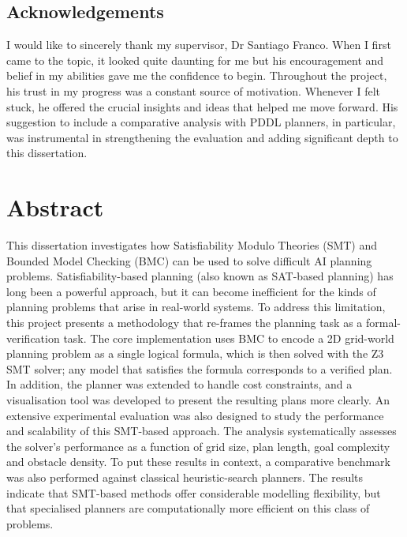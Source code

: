\documentclass[12pt, a4paper, oneside]{report} %
\begin{document}
\begin{center}
    \section*{Acknowledgements}

    I would like to sincerely thank my supervisor, Dr Santiago Franco. When I first came to the topic, it looked quite daunting for me but his encouragement and belief in my abilities gave me the confidence to begin. Throughout the project, his trust in my progress was a constant source of motivation. Whenever I felt stuck, he offered the crucial insights and ideas that helped me move forward. His suggestion to include a comparative analysis with PDDL planners, in particular, was instrumental in strengthening the evaluation and adding significant depth to this dissertation.
\end{center}

\chapter*{Abstract}
\thispagestyle{empty} 
This dissertation investigates how Satisfiability Modulo Theories (SMT) and Bounded Model Checking (BMC) can be used to solve difficult AI planning problems. Satisfiability-based planning (also known as SAT-based planning) has long been a powerful approach, but it can become inefficient for the kinds of planning problems that arise in real-world systems. To address this limitation, this project presents a methodology that re-frames the planning task as a formal-verification task. The core implementation uses BMC to encode a 2D grid-world planning problem as a single logical formula, which is then solved with the Z3 SMT solver; any model that satisfies the formula corresponds to a verified plan. In addition, the planner was extended to handle cost constraints, and a visualisation tool was developed to present the resulting plans more clearly. An extensive experimental evaluation was also designed to study the performance and scalability of this SMT-based approach. The analysis systematically assesses the solver's performance as a function of grid size, plan length, goal complexity and obstacle density. To put these results in context, a comparative benchmark was also performed against classical heuristic-search planners. The results indicate that SMT-based methods offer considerable modelling flexibility, but that specialised planners are computationally more efficient on this class of problems.
\tableofcontents
\end{document}
